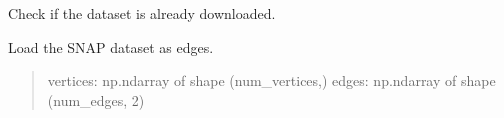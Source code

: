 \documentclass[letterpaper,10pt,english]{sphinxmanual}
\begin{document}
\begin{fulllineitems}
\begin{fulllineitems}
\end{fulllineitems}


\begin{fulllineitems}
\label{\detokenize{graphem:graphem.datasets.SNAPDataset.is_downloaded}}
\pysigstartsignatures
{}
\pysigstopsignatures
\sphinxAtStartPar
Check if the dataset is already downloaded.

\end{fulllineitems}


\begin{fulllineitems}
\label{\detokenize{graphem:graphem.datasets.SNAPDataset.load}}
\pysigstartsignatures
{}
\pysigstopsignatures
\sphinxAtStartPar
Load the SNAP dataset as edges.
\begin{quote}\begin{description}
\sphinxAtStartPar
\begin{description}
\sphinxAtStartPar
vertices: np.ndarray of shape (num\_vertices,)
edges: np.ndarray of shape (num\_edges, 2)

\end{description}


\sphinxAtStartPar
{}

\end{description}\end{quote}

\end{fulllineitems}


\end{fulllineitems}

\end{document}
